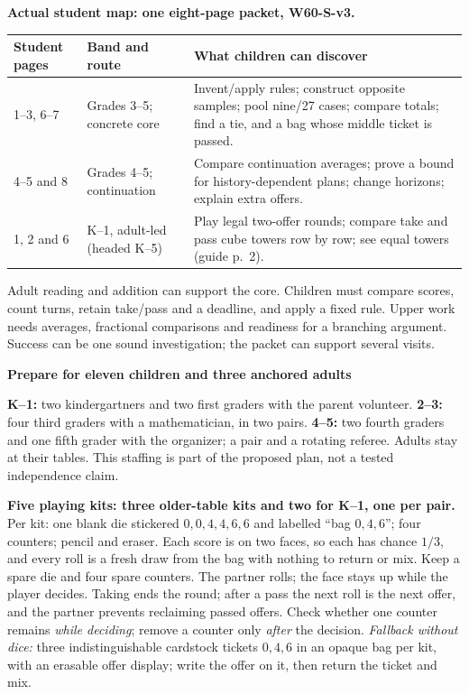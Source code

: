 \documentclass[11pt,letterpaper]{article}
\newcommand{\topic}[1]{\par\textbf{\large #1}\par}
\begin{document}
\textbf{Actual student map: one eight-page packet, W60-S-v3.}
\begin{center}\small
\begin{tabular}{@{}p{1.15in}p{1.55in}p{4.23in}@{}}\toprule
Student pages & Band and route & What children can discover \\\midrule
1--3, 6--7 & Grades 3--5; concrete core & Invent/apply rules; construct opposite samples; pool nine/27 cases; compare totals; find a tie, and a bag whose middle ticket is passed. \\
4--5 and 8 & Grades 4--5; continuation & Compare continuation averages; prove a bound for history-dependent plans; change horizons; explain extra offers. \\
1, 2 and 6 & K--1, adult-led (headed K--5) & Play legal two-offer rounds; compare take and pass cube towers row by row; see equal towers (guide p.~2). \\\bottomrule
\end{tabular}\end{center}
Adult reading and addition can support the core. Children must compare scores,
count turns, retain take/pass and a deadline, and apply a fixed rule. Upper work
needs averages, fractional comparisons and readiness for a branching argument.
Success can be one sound investigation; the packet can support several visits.

\newpage
\topic{Prepare for eleven children and three anchored adults}
\textbf{K--1:} two kindergartners and two first graders with the parent volunteer.
\textbf{2--3:} four third graders with a mathematician, in two pairs.
\textbf{4--5:} two fourth graders and one fifth grader with the organizer;
a pair and a rotating referee. Adults stay at their tables. This staffing is
part of the proposed plan, not a tested independence claim.

\textbf{Five playing kits: three older-table kits and two for K--1, one per pair.} Per kit:
one blank die stickered $0,0,4,4,6,6$ and labelled ``bag $0,4,6$''; four
counters; pencil and eraser. Each score is on two faces, so each has chance
$1/3$, and every roll is a fresh draw from the bag with nothing to return or
mix. Keep a spare die and four spare counters. The partner rolls; the face
stays up while the player decides. Taking ends the round; after a pass the
next roll is the next offer, and the partner prevents reclaiming passed
offers. Check whether one counter remains \emph{while deciding}; remove a
counter only \emph{after} the decision. \emph{Fallback without dice:} three
indistinguishable cardstock tickets $0,4,6$ in an opaque bag per kit, with an
erasable offer display; write the offer on it, then return the ticket and mix.
\end{document}
